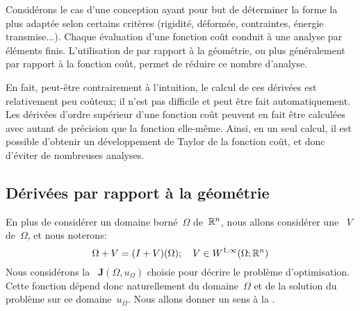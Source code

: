 
\medskip
Considérons le cas d'une conception ayant pour but de déterminer la forme la plus adaptée selon certains critères (rigidité, déformée, contraintes, énergie transmise...). Chaque évaluation d'une fonction coût conduit à une analyse par éléments finis. L'utilisation de  par rapport à la géométrie, ou plus généralement par rapport à la fonction coût, permet de réduire ce nombre d'analyse.

En fait, peut-être contrairement à l'intuition, le calcul de ces dérivées est relativement peu coûteux; il n'est pas difficile et peut être fait automatiquement. Les dérivées d'ordre supérieur d'une fonction coût peuvent en fait être calculées avec autant de précision que la fonction elle-même. Ainsi, en un seul calcul, il est possible d'obtenir un développement de Taylor de la fonction coût, et donc d'éviter de nombreuses analyses.

\medskip
\subsection{Dérivées par rapport à la géométrie}

En plus de considérer un domaine borné~$\Omega$ de~$\mathbb R^n$, nous allons considérer une ~$V$ de~$\Omega$, et nous noterons:
\begin{equation} \Omega + V = (I+V)(\Omega);\quad V\in W^{1,\infty}(\Omega;\mathbb R^n) \end{equation}
\medskipvm
Nous considérons la ~${\mathbf J}(\Omega, u_\Omega)$ choisie pour décrire le problème d'optimisation. Cette fonction dépend donc naturellement du domaine~$\Omega$ et de la solution du problème sur ce domaine~$u_\Omega$. Nous allons donner un sens à la .

